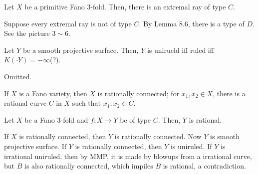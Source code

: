 \documentclass{../../small}
\begin{document}
\begin{prop}
Let $X$ be a primitive Fano 3-fold.
Then, there is an extremal ray of type $C$.
\end{prop}
\begin{pf}
Suppose every extremal ray is not of type $C$.
By Lemma 8.6, there is a type of $D$.
See the picture $3\sim 6$.
\end{pf}
\setcounter{thm}{9}
\begin{prop}
Let $Y$ be a smooth projective surface.
Then, $Y$ is unirueld iff ruled iff $K(\cdot Y)=-\infty$(?).
\end{prop}
\begin{pf}
Omitted.
\end{pf}

\begin{thm}
If $X$ is a Fano variety, then $X$ is rationally connected; for $x_1,x_2\in X$, there is a rational curve $C$ in $X$ such that $x_1,x_2\in C$.
\end{thm}

\begin{prop}
Let $X$ be a Fano 3-fold and $f:X\to Y$ be of type $C$.
Then, $Y$ is rational.
\end{prop}
\begin{pf}
If $X$ is rationally connected, then $Y$ is rationally connected.
Now $Y$ is smooth projective surface.
If $Y$ is rationally connected, then $Y$ is uniruled.
If $Y$ is irrational uniruled, then by MMP, it is made by blowups from a irrational curve, but $B$ is also rationally connected, which impiles $B$ is rational, a contradiction.
\end{pf}
\end{document}

